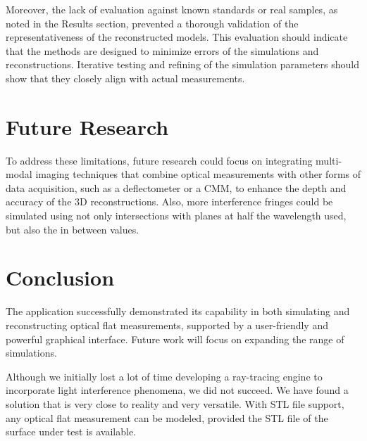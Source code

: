 \documentclass[../main.tex]{subfiles}
\begin{document}
Moreover, the lack of evaluation against known standards or real samples, as noted in the Results section, prevented a thorough validation of the representativeness of the reconstructed models. This evaluation should indicate that the methods are designed to minimize errors of the simulations and reconstructions. Iterative testing and refining of the simulation parameters should show that they closely align with actual measurements.
\vspace{-15pt}
\section{Future Research}
\vspace{-15pt}
To address these limitations, future research could focus on integrating multi-modal imaging techniques that combine optical measurements with other forms of data acquisition, such as a deflectometer or a CMM, to enhance the depth and accuracy of the 3D reconstructions. Also, more interference fringes could be simulated using not only intersections with planes at half the wavelength used, but also the in between values.
\vspace{-15pt}
\section{Conclusion}
\vspace{-15pt}
The application successfully demonstrated its capability in both simulating and reconstructing optical flat measurements, supported by a user-friendly and powerful graphical interface. Future work will focus on expanding the range of simulations.

Although we initially lost a lot of time developing a ray-tracing engine to incorporate light interference phenomena, we did not succeed. We have found a solution that is very close to reality and very versatile. With STL file support, any optical flat measurement can be modeled, provided the STL file of the surface under test is available. 
\end{document}
